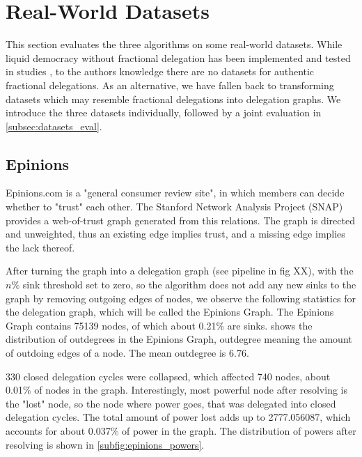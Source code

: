\section{Real-World Datasets}

This section evaluates the three algorithms on some real-world datasets. While liquid democracy without fractional delegation has been implemented and tested in studies , to the authors knowledge there are no datasets for authentic fractional delegations. As an alternative, we have fallen back to transforming datasets which may resemble fractional delegations into delegation graphs. We  introduce the three datasets individually, followed by a joint evaluation in \cref{subsec:datasets_eval}.

\subsection{Epinions}

Epinions.com is a "general consumer review site", in which members can decide whether to "trust" each other.  The Stanford Network Analysis Project (SNAP) provides a web-of-trust graph generated from this relations.  The graph is directed and unweighted, thus an existing edge implies trust, and a missing edge implies the lack thereof.

After turning the graph into a delegation graph (see pipeline in fig XX), with the $n\%$ sink threshold set to zero, so the algorithm does not add any new sinks to the graph by removing outgoing edges of nodes, we observe the following statistics for the delegation graph, which will be called the Epinions Graph. The Epinions Graph contains 75139 nodes, of which about 0.21\% are sinks.  shows the distribution of outdegrees in the Epinions Graph, outdegree meaning the amount of outdoing edges of a node. The mean outdegree is 6.76.

330 closed delegation cycles were collapsed, which affected 740 nodes, about 0.01\% of nodes in the graph. Interestingly, most powerful node after resolving is the "lost" node, so the node where power goes, that was delegated into closed delegation cycles. The total amount of power lost adds up to 2777.056087, which accounts for about 0.037\% of power in the graph. The distribution of powers after resolving is shown in \cref{subfig:epinions_powers}.

